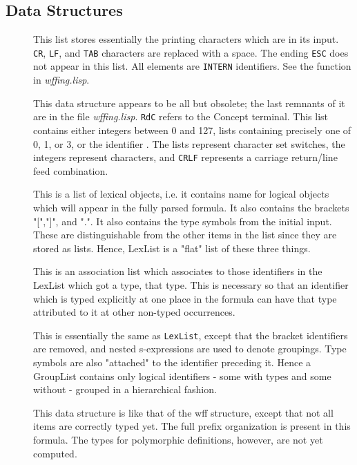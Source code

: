 \subsection{Data Structures}
\begin{description}

\item []
This list stores essentially the printing characters which are in its
input.  {\tt CR}, {\tt LF}, and {\tt TAB} characters are replaced with a space.  The
ending {\tt ESC} does not appear in this list.  All elements are {\tt INTERN}
identifiers. See the function  in {\it wffing.lisp}.

\item []
This data structure appears to be all but obsolete; the last remnants 
of it are in the file {\it wffing.lisp}. {\tt RdC} refers to the Concept terminal.
This list contains either integers between 0 and 127, lists containing
precisely one of 0, 1, or 3, or the identifier .  The lists
represent character set switches, the integers represent characters,
and {\tt CRLF} represents a carriage return/line feed combination.

\item []
This is a list of lexical objects, i.e. it contains name for logical
objects which will appear in the fully parsed formula.  It also
contains the brackets "[","]", and ".".  It also contains the type
symbols from the initial input.  These are distinguishable from the
other items in the list since they are stored as lists.  Hence,
LexList is a "flat" list of these three things.

\item []
This is an association list which associates to those identifiers in
the LexList which got a type, that type.  This is necessary so that an
identifier which is typed explicitly at one place in the formula can
have that type attributed to it at other non-typed occurrences.

\item []
This is essentially the same as {\tt LexList}, except that the bracket
identifiers are removed, and nested s-expressions are used to denote
groupings. Type symbols are also "attached" to the identifier
preceding it.  Hence a GroupList contains only logical identifiers -
some with types and some without - grouped in a hierarchical fashion.

\item []
This data structure is like that of the wff structure, except that not
all items are correctly typed yet.  The full prefix organization is
present in this formula.  The types for polymorphic definitions,
however, are not yet computed.
\end{description}

